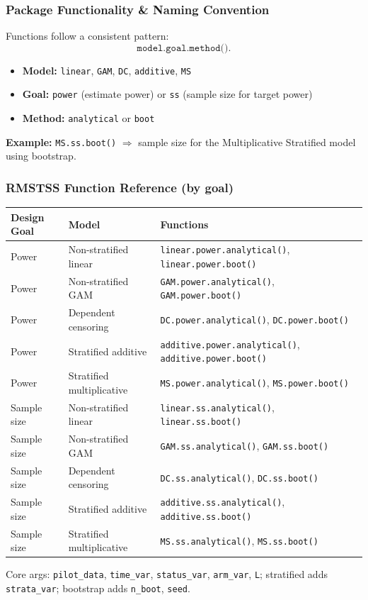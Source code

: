 \documentclass{beamer}
\begin{document}
\begin{frame}
\frametitle{Package Functionality \& Naming Convention}
Functions follow a consistent pattern:
\[
\texttt{model.goal.method()}.
\]

\begin{itemize}
  \item \textbf{Model:} \texttt{linear}, \texttt{GAM}, \texttt{DC}, \texttt{additive}, \texttt{MS}
  \item \textbf{Goal:} \texttt{power} (estimate power) or \texttt{ss} (sample size for target power)
  \item \textbf{Method:} \texttt{analytical} or \texttt{boot}
\end{itemize}

\textbf{Example:} \texttt{MS.ss.boot()} $\Rightarrow$ sample size for the Multiplicative Stratified model using bootstrap.
\end{frame}

\begin{frame}
\frametitle{RMSTSS Function Reference (by goal)}
\small
\begin{tabular}{@{}lll@{}}
\toprule
\textbf{Design Goal} & \textbf{Model} & \textbf{Functions} \\
\midrule
Power & Non-stratified linear & \texttt{linear.power.analytical()}, \texttt{linear.power.boot()} \\
Power & Non-stratified GAM & \texttt{GAM.power.analytical()}, \texttt{GAM.power.boot()} \\
Power & Dependent censoring & \texttt{DC.power.analytical()}, \texttt{DC.power.boot()} \\
Power & Stratified additive & \texttt{additive.power.analytical()}, \texttt{additive.power.boot()} \\
Power & Stratified multiplicative & \texttt{MS.power.analytical()}, \texttt{MS.power.boot()} \\
\midrule
Sample size & Non-stratified linear & \texttt{linear.ss.analytical()}, \texttt{linear.ss.boot()} \\
Sample size & Non-stratified GAM & \texttt{GAM.ss.analytical()}, \texttt{GAM.ss.boot()} \\
Sample size & Dependent censoring & \texttt{DC.ss.analytical()}, \texttt{DC.ss.boot()} \\
Sample size & Stratified additive & \texttt{additive.ss.analytical()}, \texttt{additive.ss.boot()} \\
Sample size & Stratified multiplicative & \texttt{MS.ss.analytical()}, \texttt{MS.ss.boot()} \\
\bottomrule
\end{tabular}

\vspace{0.6em}
\footnotesize Core args: \texttt{pilot\_data}, \texttt{time\_var}, \texttt{status\_var}, \texttt{arm\_var}, \texttt{L}; stratified adds \texttt{strata\_var}; bootstrap adds \texttt{n\_boot}, \texttt{seed}.
\end{frame}
\end{document}
